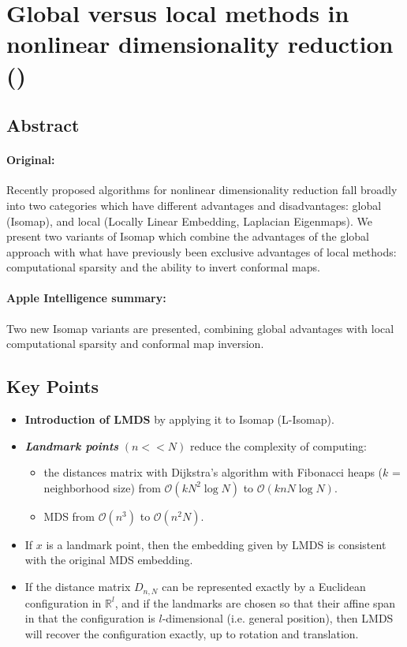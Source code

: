 \documentclass[a4paper,12pt]{article}
\begin{document}
\pagebreak
\section{Global versus local methods in nonlinear dimensionality reduction (\texorpdfstring{\cite{Silva2002}}{})}
\label{sec:deSilvaTenenbaum2002}

\subsection{Abstract}

\paragraph{Original:} Recently proposed algorithms for nonlinear dimensionality reduction fall broadly into two categories which have different advantages and disadvantages: global (Isomap), and local (Locally Linear Embedding, Laplacian Eigenmaps). We present two variants of Isomap which combine the advantages of the global approach with what have previously been exclusive advantages of local methods: computational sparsity and the ability to invert conformal maps.

\paragraph{Apple Intelligence summary:} Two new Isomap variants are presented, combining global advantages with local computational sparsity and conformal map inversion.

\subsection{Key Points}

\begin{itemize}
    \item \textbf{Introduction of LMDS} by applying it to Isomap (L-Isomap).
    \item \textbf{\textit{Landmark points}} $(n << N)$ reduce the complexity of computing:
    \begin{itemize}
        \item the distances matrix with Dijkstra's algorithm with Fibonacci heaps ($k$ = neighborhood size) from $\mathcal{O}(kN^2\log N)$ to $\mathcal{O}(knN\log N)$.
        \item MDS from $\mathcal{O}(n^3)$ to $\mathcal{O}(n^2N)$.
    \end{itemize}
    \item If $x$ is a landmark point, then the embedding given by LMDS is consistent with the original MDS embedding.
    \item If the distance matrix $D_{n,N}$ can be represented exactly by a Euclidean configuration in $\mathbb{R}^l$, and if the landmarks are chosen so that their affine span in that the configuration is $l$-dimensional (i.e. general position), then LMDS will recover the configuration exactly, up to rotation and translation.
\end{itemize}
\end{document}
